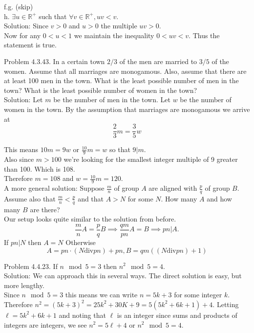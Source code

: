 \documentclass[10 pt]{amsart}
\theoremstyle{definition}
\theoremstyle{remark}
\numberwithin{equation}{subsection}
\begin{document}
f.g. (skip)\\

h. $\exists u\in\mathbb{R}^{+}$ such that $\forall v\in\mathbb{R}^{+}, uv<v$.\\
Solution: Since $v>0$ and $u>0$ the multiple $uv>0$.\\
Now for any $0<u<1$ we maintain the inequality $0< uv < v$.  Thus the statement is true.

\newpage

Problem 4.3.43.  In a certain town $2/3$ of the men are married to $3/5$ of the women.  Assume that all marriages are monogamous.  Also, assume that there are at least 100 men in the town.  What is the least possible number of men in the town?  What is the least possible number of women in the town?\\

Solution: Let $m$ be the number of men in the town.  Let $w$ be the number of women in the town.  By the assumption that marriages are monogamous we arrive at
\[
\frac{2}{3} m = \frac{3}{5} w
\]

This means $10 m = 9w$ or $\frac{10}{9} m = w$ so that $9 | m$.\\
Also since $m>100$ we're looking for the smallest integer multiple of 9 greater than 100.  Which is 108.\\
Therefore $m =108$ and $w = \frac{10}{9} m = 120$.\\

A more general solution: Suppose $\frac{m}{n}$ of group $A$ are aligned with $\frac{p}{q}$ of group $B$.  Assume also that $\frac{m}{n}<\frac{p}{q}$ and that $A>N$ for some $N$.  How many $A$ and how many $B$ are there?\\
Our setup looks quite similar to the solution from before.
\[
\frac{m}{n} A = \frac{p}{q} B \implies \frac{qm}{pn} A=B \implies pn|A.
\]
If $pn | N$ then $A = N$ Otherwise
\[
A = pn \cdot (N \mathrm{div} pn) + pn, B = qm((N \mathrm{div} pn) +1) 
\]


\newpage

Problem 4.4.23. If $n \mod{5} = 3$ then $n^2 \mod{5} = 4$.\\
Solution: We can approach this in several ways. 
The direct solution is easy, but more lengthy.\\
Since $n \mod{5} = 3$ this means we can write $n=5k+3$ for some integer $k$.
Therefore $n^2 = (5k+3)^2 = 25k^2 + 30K + 9 = 5(5k^2+6k+1) + 4.$
Letting $\ell = 5k^2+6k+1$ and noting that $\ell$ is an integer since sums and products of integers are integers, we see $n^2 = 5\ell+4$ or $n^2\mod{5}=4$.\\
\end{document}
